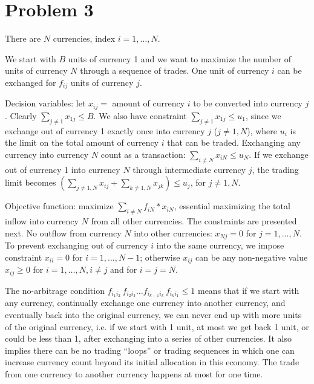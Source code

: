 \documentclass{article}
\begin{document}
\section{Problem 3}
\newcommand{\ccy}[1]{currency#1}

There are $N$ currencies, index $i=1,\dots,N$.

We start with $B$ units of currency 1 and we want to maximize the number
of units of currency $N$ through a sequence of trades. One unit of 
currency $i$ can be exchanged for $f_{ij}$ units of currency $j$.

Decision variables: let $x_{ij} =$ amount of currency $i$ to be converted 
into currency $j$. Clearly $\sum_{j\not= 1}x_{1j}\leq B$. We also have 
constraint $\sum_{j\not= 1}x_{1j}\leq u_1$, since we exchange out of 
currency 1 exactly once into currency $j$ ($j \not= 1,N$), 
where $u_i$ is the limit on the total amount of currency $i$ that can be
traded. Exchanging any currency into currency $N$ count as a transaction: 
$\sum_{i\not= N}x_{iN}\leq u_N$.
If we exchange out of currency 1 into currency $N$ through 
intermediate currency $j$, the trading limit becomes
$(\sum_{j \not= 1,N}x_{ij} + \sum_{k \not= 1,N}x_{jk}) \leq u_j$, for $j \not= 1,N$.

Objective function: maximize $\sum_{i \not= N} f_{iN} * x_{iN}$, essential
maximizing the total inflow into currency $N$ from all other currencies.
The constraints are presented next.
No outflow from currency $N$ into other currencies: $x_{Nj}=0$ for $j=1,\dots,N$.
To prevent exchanging out of currency $i$ into the same currency, 
we impose constraint $x_{ii}=0$ for $i=1,\dots,N-1$; otherwise $x_{ij}$ can be
any non-negative value
$x_{ij}\geq 0$ for $i=1,\dots,N, i\not= j$ and for $i=j=N$.

The no-arbitrage condition 
$f_{i_1 i_2}\,f_{i_2 i_3}\dots f_{i_{k-1} i_k}\,f_{i_k i_1}\leq 1 $ means
that if we start with any currency, continually exchange one currency into another
currency, and eventually back into the original currency, we can never end up
with more units of the original currency, i.e. if we start with 1 unit, at
most we get back 1 unit, or could be less than 1, after exchanging into a series of
other currencies. It also implies there can be no trading ``loops'' or trading 
sequences in which one can increase currency count beyond its initial allocation
in this economy. 
The trade from one currency to another currency happens at most for one time.
\end{document}
